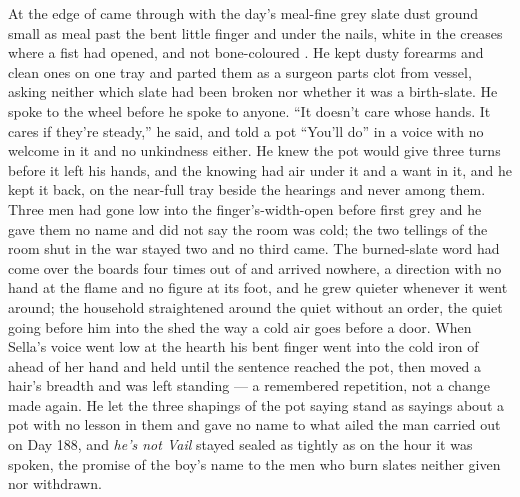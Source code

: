 At the edge of   came through with the day's meal-fine grey slate dust ground small as meal past the bent little finger and under the nails, white in the creases where a fist had opened, and not bone-coloured . He kept dusty forearms and clean ones on one tray and parted them as a surgeon parts clot from vessel, asking neither which slate had been broken nor whether it was a birth-slate. He spoke to the wheel before he spoke to anyone. “It doesn’t care whose hands. It cares if they’re steady,” he said, and told a pot “You’ll do” in a voice with no welcome in it and no unkindness either. He knew  the pot would give three turns before it left his hands, and the knowing had air under it and a want in it, and he kept it back, on the near-full tray beside the hearings and never among them. Three men had gone low into the finger's-width-open  before first grey and he gave them no name and did not say the room was cold; the two tellings of the room shut in the war stayed two and no third came. The burned-slate word had come over the boards four times out of  and arrived nowhere, a direction with no hand at the flame and no figure at its foot, and he grew quieter whenever it went around; the household straightened around the quiet without an order, the quiet going before him into the shed the way a cold air goes before a door. When Sella's voice went low at the hearth his bent finger went into the cold iron of  ahead of her hand and held until the sentence reached the pot, then moved a hair's breadth and was left standing --- a remembered repetition, not a change made again. He let the three shapings of the pot saying stand as sayings about a pot with no lesson in them and gave no name to what ailed the man carried out on Day 188, and \emph{he's not Vail} stayed sealed as tightly as on the hour it was spoken, the promise of the boy's name to the men who burn slates neither given nor withdrawn.

